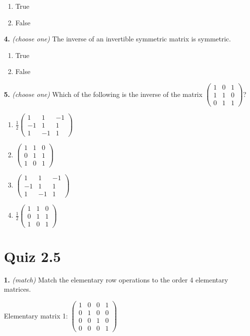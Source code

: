 \documentclass[10pt,a4paper]{article}
\begin{document}
\begin{enumerate}[label=(\Alph*)]
\item True
\item False
\end{enumerate}
\smallskip
\textbf{4.} \textit{(choose one)} The inverse of an invertible symmetric matrix is symmetric.

\begin{enumerate}[label=(\Alph*)]
\item True
\item False
\end{enumerate}
\smallskip
\textbf{5.} \textit{(choose one)} Which of the following is the inverse of the matrix \(\begin{pmatrix}1&0&1\\1&1&0\\0&1&1\end{pmatrix}\)?

\begin{enumerate}[label=(\Alph*)]
\item \(\frac{1}{2}\begin{pmatrix}1&1&-1\\-1&1&1\\1&-1&1\end{pmatrix}\)
\item \(\begin{pmatrix}1&1&0\\0&1&1\\1&0&1\end{pmatrix}\)
\item \(\begin{pmatrix}1&1&-1\\-1&1&1\\1&-1&1\end{pmatrix}\)
\item \(\frac{1}{2}\begin{pmatrix}1&1&0\\0&1&1\\1&0&1\end{pmatrix}\)
\end{enumerate}
\smallskip
\section{Quiz 2.5}
\textbf{1.} \textit{(match)} Match the elementary row operations to the order 4 elementary matrices.

Elementary matrix 1: \(\begin{pmatrix}1&0&0&1\\0&1&0&0\\0&0&1&0\\0&0&0&1\end{pmatrix}\)
\end{document}
